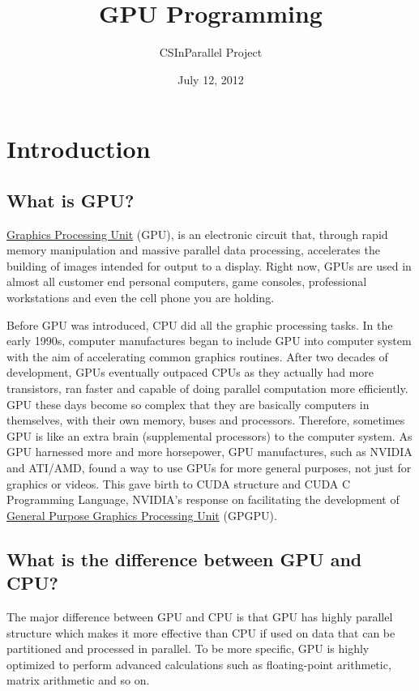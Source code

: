 \documentclass[letterpaper,10pt,openany,oneside]{sphinxmanual}
\title{GPU Programming}
\date{July 12, 2012}
\author{CSInParallel Project}
\begin{document}
\maketitle
\tableofcontents
{}\label{index::doc}



\chapter{Introduction}
\label{Introduction/Introduction:introduction}\label{Introduction/Introduction:gpu-programming}\label{Introduction/Introduction::doc}

\section{What is GPU?}
\label{Introduction/Introduction:what-is-gpu}
\href{http://en.wikipedia.org/wiki/GPU}{Graphics Processing Unit} (GPU), is an electronic circuit that, through rapid memory manipulation and massive parallel data processing, accelerates the building of images intended for output to a display. Right now, GPUs are used in almost all customer end personal computers, game consoles, professional workstations and even the cell phone you are holding.

Before GPU was introduced, CPU did all the graphic processing tasks. In the early 1990s, computer manufactures began to include GPU into computer system with the aim of accelerating common graphics routines. After two decades of development, GPUs eventually outpaced CPUs as they actually had more transistors, ran faster and capable of doing parallel computation more efficiently. GPU these days become so complex that they are basically computers in themselves, with their own memory, buses and processors. Therefore, sometimes GPU is like an extra brain (supplemental processors) to the computer system. As GPU harnessed more and more horsepower, GPU manufactures, such as NVIDIA and ATI/AMD, found a way to use GPUs  for more general purposes, not just for graphics or videos. This gave birth to CUDA structure and CUDA C Programming Language, NVIDIA's response on facilitating the development of \href{http://en.wikipedia.org/wiki/GPGPU}{General Purpose Graphics Processing Unit} (GPGPU).


\section{What is the difference between GPU and CPU?}
\label{Introduction/Introduction:general-purpose-graphics-processing-unit}\label{Introduction/Introduction:what-is-the-difference-between-gpu-and-cpu}
The major difference between GPU and CPU is that GPU has highly parallel structure which makes it more effective than CPU if used on data that can be partitioned and processed in parallel. To be more specific, GPU is highly optimized to perform advanced calculations such as floating-point arithmetic, matrix arithmetic and so on.
\end{document}
